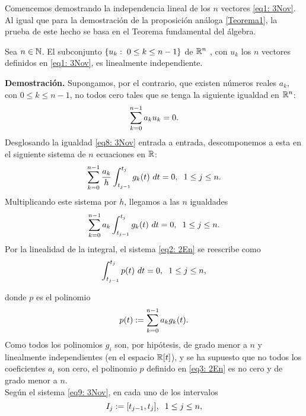 Comencemos demostrando la independencia lineal
de los $n$ vectores \eqref{eq1: 3Nov}. Al igual que para
la demostración de la proposición análoga 
\ref{Teorema1},
la prueba de este hecho se basa en el Teorema
fundamental del álgebra.

\begin{prop}
\label{prop: los uk forman una base de Rn}
Sea $n \in \mathbb{N}$. El 
subconjunto $\{u_{k} : \hspace{0.1cm} 0 \leq k \leq n-1 \}$
de $\mathbb{R}^{n}$ , con
$u_{k}$ los $n$ vectores definidos en 
\eqref{eq1: 3Nov},
es linealmente independiente.
\end{prop}
\noindent
\textbf{Demostración.}
Supongamos, por el contrario, 
que existen números reales $a_{k}$, con $0 \leq k \leq n-1$,
no todos cero tales que se tenga la siguiente igualdad en $\mathbb{R}^{n}$:
\begin{equation}
\label{eq8: 3Nov}
\sum\limits_{k=0}^{n-1}a_{k}u_{k}=0.
\end{equation}
Desglosando
la igualdad \eqref{eq8: 3Nov} 
entrada a entrada, descomponemos
a esta en el siguiente sistema de $n$ ecuaciones en $\mathbb{R}$:
\[
\sum\limits_{k=0}^{n-1} \frac{a_{k}}{h} \int_{t_{j-1}}^{t_{j}}g_{k}(t)\ dt = 0,
\hspace{0.2cm} 1 \leq j \leq n.
\]
Multiplicando este sistema por $h$, llegamos a las
$n$ igualdades
\begin{equation}
\label{eq2: 2En}
\sum\limits_{k=0}^{n-1}a_{k} \int_{t_{j-1}}^{t_{j}}g_{k}(t)\ dt = 0,
\hspace{0.2cm} 1 \leq j \leq n.
\end{equation}
Por la linealidad de la integral, el sistema \eqref{eq2: 2En}
se reescribe como
\begin{equation}
\label{eq9: 3Nov}
\int_{t_{j-1}}^{t_{j}}p(t)\ dt =0,
\hspace{0.2cm} 1 \leq j \leq n,
\end{equation}


\noindent donde $p$ es el polinomio 
\begin{equation}
\label{eq3: 2En}
p(t):=\sum\limits_{k=0}^{n-1}a_{k}g_{k}(t). 
\end{equation}
Como todos los polinomios $g_{i}$ son,
por hipótesis, de 
grado menor a $n$ y linealmente independientes
(en el espacio $\mathbb{R}[t]$),
y se ha supuesto que no
todos los
coeficientes $a_{i}$ son cero, el polinomio
$p$ definido en \eqref{eq3: 2En} es no cero y de grado
menor a $n$. \\

Según el sistema \eqref{eq9: 3Nov}, en cada uno
de los intervalos
\[
I_{j}:=[t_{j-1}, t_{j}], \hspace{0.2cm} 1 \leq j \leq n,
\]


